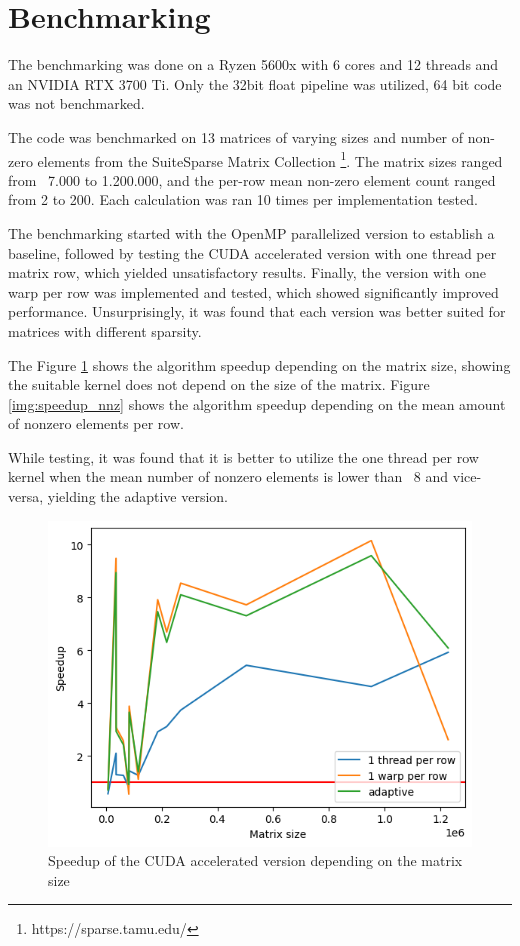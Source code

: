 \documentclass{article}
\begin{document}
\section{Benchmarking}
The benchmarking was done on a Ryzen 5600x with 6 cores and 12 threads and an NVIDIA RTX 3700 Ti.
Only the 32bit float pipeline was utilized, 64 bit code was not benchmarked.

The code was benchmarked on 13 matrices of varying sizes and number of non-zero elements
from the SuiteSparse Matrix Collection \footnote{https://sparse.tamu.edu/}.
The matrix sizes ranged from ~7.000 to 1.200.000,
and the per-row mean non-zero element count ranged from 2 to 200.
Each calculation was ran 10 times per implementation tested.

The benchmarking started with the OpenMP parallelized version to establish a baseline,
followed by testing the CUDA accelerated version with one thread per matrix row,
which yielded unsatisfactory results.
Finally, the version with one warp per row was implemented and tested,
which showed significantly improved performance.
Unsurprisingly, it was found that each version was better suited for matrices with different sparsity.

The Figure \ref{img:speedup_size} shows the algorithm speedup depending on the matrix size,
showing the suitable kernel does not depend on the size of the matrix.
Figure \ref{img:speedup_nnz} shows the algorithm speedup depending on the mean amount of nonzero elements per row.

While testing, it was found that it is better to utilize the one thread per row kernel
when the mean number of nonzero elements is lower than ~8 and vice-versa, yielding the adaptive version.

\begin{figure}[H]
\includegraphics[]{images/speedup_size.png}
\centering
\caption{Speedup of the CUDA accelerated version depending on the matrix size}
\label{img:speedup_size}
\end{figure}
\end{document}
